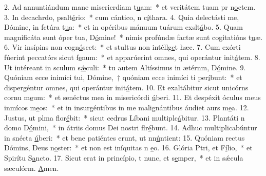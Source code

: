 2. Ad annuntiándum mane misericrdiam t\uline{u}am:~* et veritátem tuam pr n\uline{o}ctem.
3. In decachrdo, psalt\uline{é}rio:~* cum cántico, n c\uline{í}thara.
4. Quia delectásti me, Dómine, in fctúra t\uline{u}a:~* et in opéribus mánuum tuárum exslt\uline{á}bo.
5. Quam magnificáta sunt óper tua, D\uline{ó}mine!~* nimis profúndæ factæ sunt cogitatións t\uline{u}æ.
6. Vir insípins non cogn\uline{ó}scet:~* et stultus non intéllg\uline{e}t hæc.
7. Cum exórti fúerint peccatórs sicut f\uline{e}num:~* et apparúerint omnes, qui operántur init\uline{á}tem.
8. Ut intéreant in sculum s\uline{ǽ}culi:~* tu autem Altíssimus in ætérnm, D\uline{ó}mine.
9. Quóniam ecce inimíci tui, Dómine,~† quóniam ecce inimíci ti per\uline{í}bunt:~* et dispergéntur omnes, qui operántur init\uline{á}tem.
10. Et exaltábitur sicut unicórns cornu m\uline{e}um:~* et senéctus mea in misericórdi \uline{ú}beri.
11. Et despéxit óculus meus inmícos m\uline{e}os:~* et in insurgéntibus in me malignántibus áudiet aurs m\uline{e}a.
12. Justus, ut plma flor\uline{é}bit:~* sicut cedrus Líbani multiplc\uline{á}bitur.
13. Plantáti n domo D\uline{ó}mini,~* in átriis domus Dei nostri flr\uline{é}bunt.
14. Adhuc multiplicabúntur in snécta \uline{ú}beri:~* et bene patiéntes erunt, ut nn\uline{ú}ntient:
15. Quóniam rectus Dómins, Deus n\uline{o}ster:~* et non est iníquitas n \uline{e}o.
16. Glória Ptri, et F\uline{í}lio,~* et Spirítu S\uline{a}ncto.
17. Sicut erat in princípio, t nunc, et s\uline{e}mper,~* et in sǽcula sæculórm. \uline{A}men.
